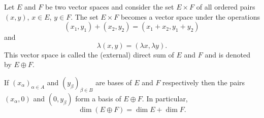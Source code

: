 Let $E$ and $F$ be two vector spaces and consider the set $E \times F$ of all ordered pairs $(x, y)$, $x \in E$, $y \in F$. The set $E \times F$ becomes a vector space under the operations
$$(x_1, y_1) + (x_2, y_2) = (x_1 + x_2, y_1 + y_2)$$
and
$$\lambda(x, y) = (\lambda x, \lambda y).$$
This vector space is called the (external) direct sum of $E$ and $F$ and is denoted by $E \oplus F$.

If $(x_\alpha)_{\alpha \in A}$ and $(y_\beta)_{\beta \in B}$ are bases of $E$ and $F$ respectively then the pairs $(x_\alpha, 0)$ and $(0, y_\beta)$ form a basis of $E \oplus F$. In particular,
$$\dim(E \oplus F) = \dim E + \dim F.$$
